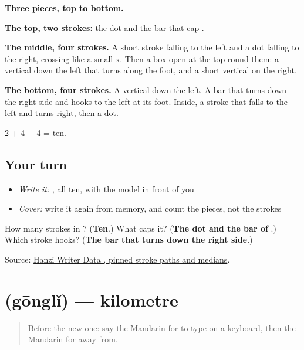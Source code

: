 \begin{quote}
\end{quote}

\textbf{Three pieces, top to bottom.}

\textbf{The top, two strokes:} the dot and the bar that cap .

\textbf{The middle, four strokes.} A short stroke falling to the left and a dot falling to the right, crossing like a small x. Then a box open at the top round them: a vertical down the left that turns along the foot, and a short vertical on the right.

\textbf{The bottom, four strokes.} A vertical down the left. A bar that turns down the right side and hooks to the left at its foot. Inside, a stroke that falls to the left and turns right, then a dot.

2 + 4 + 4 = ten.

\subsection*{Your turn}
\begin{itemize}
\raggedright
  \item \emph{Write it:} , all ten, with the model in front of you
  \item \emph{Cover:} write it again from memory, and count the pieces, not the strokes
\end{itemize}

\begin{tcolorbox}[breakable,colback=teal!4,colframe=teal!35!black,title={Before you move on}]
How many strokes in ? (\textbf{Ten}.) What caps it? (\textbf{The dot and the bar of }.) Which stroke hooks? (\textbf{The bar that turns down the right side}.)

Source: \href{https://raw.githubusercontent.com/chanind/hanzi-writer-data/68d10a4b21150cae5e1ebbd223eed289cf32d90c/data/\%E7\%A6\%BB.json}{Hanzi Writer Data , pinned stroke paths and medians}.
\end{tcolorbox}
\section[\texorpdfstring{\zh{公里} (gōnglǐ)}{公里 (gōnglǐ)}]{ (gōnglǐ) — kilometre}

\label{lesson:ZH-C205-gongli}



\begin{quote}
Before the new one: say the Mandarin for to type on a keyboard, then the Mandarin for away from.
\end{quote}

